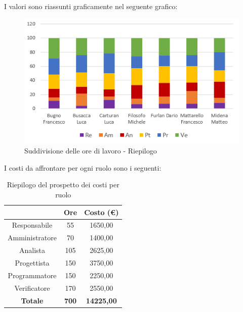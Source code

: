 I valori sono riassunti graficamente nel seguente grafico:

\begin{figure}[H]
  \centering
  \includegraphics[scale=1.2]{immagini/ore_lavoro_riepilogo.png}
  \caption{Suddivisione delle ore di lavoro - Riepilogo}
\end{figure}

\pagebreak
I costi da affrontare per ogni ruolo sono i seguenti:

\begin{table}[H]
  \centering
  \renewcommand{\arraystretch}{1.8}
  \begin{tabular}{c|c|c}
    \rowcolor[HTML]{125E28}
    \multicolumn{1}{c}{\color[HTML]{FFFFFF}\textbf{Ruolo}}
                    & \multicolumn{1}{c}{\color[HTML]{FFFFFF}\textbf{Ore}}
                    & \multicolumn{1}{c}{\color[HTML]{FFFFFF}\textbf{Costo (€)}}                     \\
    \hline
    Responsabile    & 55                                                         & 1650,00           \\
    Amministratore  & 70                                                         & 1400,00           \\
    Analista        & 105                                                        & 2625,00           \\
    Progettista     & 150                                                        & 3750,00           \\
    Programmatore   & 150                                                        & 2250,00           \\
    Verificatore    & 170                                                        & 2550,00           \\
    \textbf{Totale} & \textbf{700}                                               & \textbf{14225,00}
  \end{tabular}
  \caption{Riepilogo del prospetto dei costi per ruolo}
\end{table}

